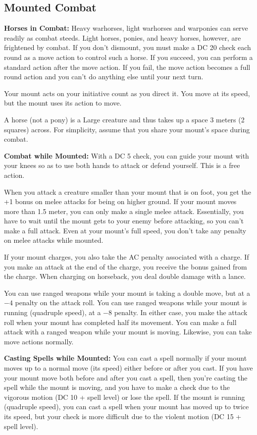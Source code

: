 \subsection{Mounted Combat}
\textbf{Horses in Combat:} Heavy warhorses, light warhorses and warponies can serve readily as combat steeds. Light horses, ponies, and heavy horses, however, are frightened by combat. If you don't dismount, you must make a DC 20  check each round as a move action to control such a horse. If you succeed, you can perform a standard action after the move action. If you fail, the move action becomes a full round action and you can't do anything else until your next turn.

Your mount acts on your initiative count as you direct it. You move at its speed, but the mount uses its action to move.

A horse (not a pony) is a Large creature and thus takes up a space 3 meters (2 squares) across. For simplicity, assume that you share your mount's space during combat.

\textbf{Combat while Mounted:} With a DC 5  check, you can guide your mount with your knees so as to use both hands to attack or defend yourself. This is a free action.

When you attack a creature smaller than your mount that is on foot, you get the +1 bonus on melee attacks for being on higher ground. If your mount moves more than 1.5 meter, you can only make a single melee attack. Essentially, you have to wait until the mount gets to your enemy before attacking, so you can't make a full attack. Even at your mount's full speed, you don't take any penalty on melee attacks while mounted.

If your mount charges, you also take the AC penalty associated with a charge. If you make an attack at the end of the charge, you receive the bonus gained from the charge. When charging on horseback, you deal double damage with a lance.

You can use ranged weapons while your mount is taking a double move, but at a $-4$ penalty on the attack roll. You can use ranged weapons while your mount is running (quadruple speed), at a $-8$ penalty. In either case, you make the attack roll when your mount has completed half its movement. You can make a full attack with a ranged weapon while your mount is moving. Likewise, you can take move actions normally.

\textbf{Casting Spells while Mounted:} You can cast a spell normally if your mount moves up to a normal move (its speed) either before or after you cast. If you have your mount move both before and after you cast a spell, then you're casting the spell while the mount is moving, and you have to make a  check due to the vigorous motion (DC 10 + spell level) or lose the spell. If the mount is running (quadruple speed), you can cast a spell when your mount has moved up to twice its speed, but your  check is more difficult due to the violent motion (DC 15 + spell level).

